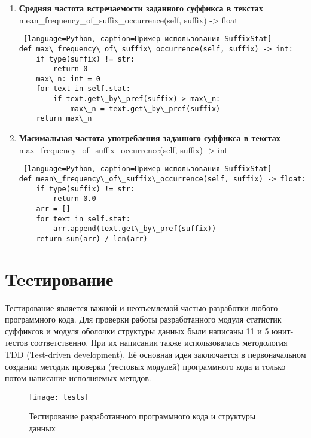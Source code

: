 \documentclass[a4paper,12pt]{article}
\begin{document}
\begin{enumerate}
\item {\textbf{Средняя частота встречаемости заданного суффикса в текстах}\\
mean\_frequency\_of\_suffix\_occurrence(self, suffix) -> float}

\begin{lstlisting} [language=Python, caption=Пример использования SuffixStat]
def max\_frequency\_of\_suffix\_occurrence(self, suffix) -> int:
    if type(suffix) != str:
        return 0
    max\_n: int = 0
    for text in self.stat:
        if text.get\_by\_pref(suffix) > max\_n:
            max\_n = text.get\_by\_pref(suffix)
    return max\_n
\end{lstlisting}

\item {\textbf{Масимальная частота употребления заданного суффикса в текстах}\\
max\_frequency\_of\_suffix\_occurrence(self, suffix) -> int \\}

\begin{lstlisting} [language=Python, caption=Пример использования SuffixStat]
def mean\_frequency\_of\_suffix\_occurrence(self, suffix) -> float:
    if type(suffix) != str:
        return 0.0
    arr = []
    for text in self.stat:
        arr.append(text.get\_by\_pref(suffix))
    return sum(arr) / len(arr)
\end{lstlisting}
\end{enumerate}

\newpage

\section{Tecтирование}

Тестирование является важной и неотъемлемой частью разработки любого программного кода. Для проверки работы разработанного модуля статистик суффиксов и модуля оболочки структуры данных были написаны 11 и 5 юнит-тестов соответственно. При их написании также использовалась методология TDD (Test-driven development). Её основная идея заключается в первоначальном создании методик проверки (тестовых модулей) программного кода и только потом написание исполняемых методов.\\

\begin{figure}[ht!]
    \centering
    \texttt{[image: tests]}
    \caption{Тестирование разработанного программного кода и структуры данных}
\end{figure}
\end{document}
